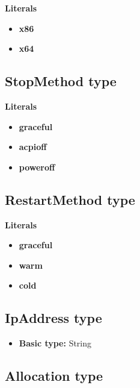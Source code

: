\documentclass{article}
\begin{document}
\textbf{Literals}
\begin{itemize}
\item \textbf{x86} 
\end{itemize}
\begin{itemize}
\item \textbf{x64} 
\end{itemize}

\subsection{StopMethod type}

\textbf{Literals}
\begin{itemize}
\item \textbf{graceful} 
\end{itemize}
\begin{itemize}
\item \textbf{acpioff} 
\end{itemize}
\begin{itemize}
\item \textbf{poweroff} 
\end{itemize}

\subsection{RestartMethod type}

\textbf{Literals}
\begin{itemize}
\item \textbf{graceful} 
\end{itemize}
\begin{itemize}
\item \textbf{warm} 
\end{itemize}
\begin{itemize}
\item \textbf{cold} 
\end{itemize}

\subsection{IpAddress type}

\begin{itemize}
\item \textbf{Basic type:} String
\end{itemize}
\subsection{Allocation type}
\end{document}
